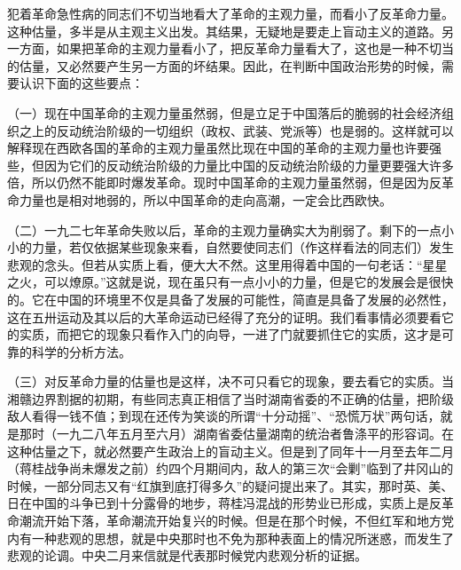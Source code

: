 犯着革命急性病的同志们不切当地看大了革命的主观力量，而看小了反革命力量。这种估量，多半是从主观主义出发。其结果，无疑地是要走上盲动主义的道路。另一方面，如果把革命的主观力量看小了，把反革命力量看大了，这也是一种不切当的估量，又必然要产生另一方面的坏结果。因此，在判断中国政治形势的时候，需要认识下面的这些要点：

（一）现在中国革命的主观力量虽然弱，但是立足于中国落后的脆弱的社会经济组织之上的反动统治阶级的一切组织（政权、武装、党派等）也是弱的。这样就可以解释现在西欧各国的革命的主观力量虽然比现在中国的革命的主观力量也许要强些，但因为它们的反动统治阶级的力量比中国的反动统治阶级的力量更要强大许多倍，所以仍然不能即时爆发革命。现时中国革命的主观力量虽然弱，但是因为反革命力量也是相对地弱的，所以中国革命的走向高潮，一定会比西欧快。

（二）一九二七年革命失败以后，革命的主观力量确实大为削弱了。剩下的一点小小的力量，若仅依据某些现象来看，自然要使同志们（作这样看法的同志们）发生悲观的念头。但若从实质上看，便大大不然。这里用得着中国的一句老话：“星星之火，可以燎原。”这就是说，现在虽只有一点小小的力量，但是它的发展会是很快的。它在中国的环境里不仅是具备了发展的可能性，简直是具备了发展的必然性，这在五卅运动及其以后的大革命运动已经得了充分的证明。我们看事情必须要看它的实质，而把它的现象只看作入门的向导，一进了门就要抓住它的实质，这才是可靠的科学的分析方法。

（三）对反革命力量的估量也是这样，决不可只看它的现象，要去看它的实质。当湘赣边界割据的初期，有些同志真正相信了当时湖南省委的不正确的估量，把阶级敌人看得一钱不值；到现在还传为笑谈的所谓“十分动摇”、“恐慌万状”两句话，就是那时（一九二八年五月至六月）湖南省委估量湖南的统治者鲁涤平的形容词。在这种估量之下，就必然要产生政治上的盲动主义。但是到了同年十一月至去年二月（蒋桂战争尚未爆发之前）约四个月期间内，敌人的第三次“会剿”临到了井冈山的时候，一部分同志又有“红旗到底打得多久”的疑问提出来了。其实，那时英、美、日在中国的斗争已到十分露骨的地步，蒋桂冯混战的形势业已形成，实质上是反革命潮流开始下落，革命潮流开始复兴的时候。但是在那个时候，不但红军和地方党内有一种悲观的思想，就是中央那时也不免为那种表面上的情况所迷惑，而发生了悲观的论调。中央二月来信就是代表那时候党内悲观分析的证据。

